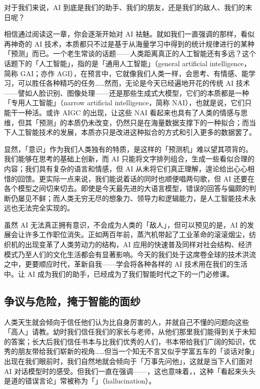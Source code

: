 对于我们来说，AI 到底是我们的助手、我们的朋友，还是我们的敌人、我们的末日呢？

相信通过阅读这一章，你会逐渐开始对 AI 袪魅。就如我们一直强调的那样，看似再神奇的 AI 技术，本质都只不过是基于从海量学习中得到的统计规律进行的某种「预测」而已。一个老生常谈的话题——人类距离真正的人工智能还有多远？这个话题下的「人工智能」，指的是「通用人工智能」（general artificial intelligence，简称 GAI；亦作 AGI），在预言中，它就像我们人类一样，会思考、有情感、能学习，可以胜任各种精巧的任务……然而，无论是今天已经遍地开花的传统 AI 技术——譬如人脸识别、图像处理——还是那些生成式大模型，它们的本质都是一种「专用人工智能」（narrow artificial intelligence，简称 NAI），也就是说，它们只能干一种活。或许 AIGC 的出现，让这些 NAI 看起来也具有了人类的情感与思维，但其「预测」的本质仍未改变，仍然只是在海量数据支撑下的一种拟合；而当下人工智能技术的发展，本质亦只是改进这种拟合的方式和引入更多的数据罢了。

显然，「意识」作为我们人类独有的特质，是这样的「预测机」难以望其项背的。我们能够在思考的基础上创新，而 AI 只能将文字排列组合，生成一些看似合理的内容；我们具有复杂的语言和情感，但 AI 从未将它们真正理解，遑论给出心心相惜的回馈。更实际一点来说，我们能说着话的同时也顺便唱两句歌，但 AI 还要在各个模型之间切来切去。即使是今天最先进的大语言模型，错误的回答与偏颇的判断仍屡见不鲜；而人类无穷无尽的想象力、领导力和逻辑能力，是人工智能技术永远也无法完全实现的。

虽然 AI 无法真正拥有意识，不会成为人类的「敌人」，但可以预见的是，AI 的发展会让许多工作职位消失。正如两百年前，蒸汽机带起了工业革命的滚滚烟尘，纺织机的出现变革了人类劳动力的结构，AI 应用的快速普及同样对社会结构、经济模式乃至人们的文化生活都会有显著影响。今天的我们处于这席卷全球的技术洪流之中，更要顺应时代，革新自我——学会将各种各样的 AI 技术用在我们的生活中。让 AI 成为我们的助手，已经成为了我们智能时代之下的一门必修课。

\subsection{争议与危险，掩于智能的面纱}

人类天生就会倾向于信任他们认为比自身厉害的人，并就自己不懂的问题向这些「高人」请教。幼时我们信任我们的家长与老师，从他们那里我们能得到关于未知的答案；长大后我们信任书本与比我们优秀的人们，书本带给我们广阔的知识，优秀的朋友带给我们崭新的视角……但当一个知无不言又似乎学富五车的「谈话对象」出现在我们眼前时，我们自然地就会倾向于「万事先问他」，这就是当下人们面对 AI 对话模型时的感受。但我们一直在强调——，这也意味着，，这种「看起来头头是道的错误言论」常被称为「」（hallucination）。

